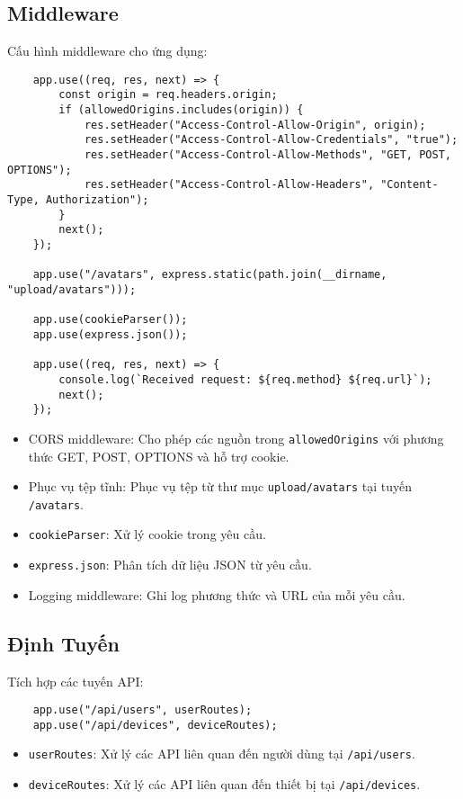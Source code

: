         \subsection{Middleware}
            \hspace*{0.6cm}Cấu hình middleware cho ứng dụng:
            \begin{lstlisting}
    app.use((req, res, next) => {
        const origin = req.headers.origin;
        if (allowedOrigins.includes(origin)) {
            res.setHeader("Access-Control-Allow-Origin", origin);
            res.setHeader("Access-Control-Allow-Credentials", "true");
            res.setHeader("Access-Control-Allow-Methods", "GET, POST, OPTIONS");
            res.setHeader("Access-Control-Allow-Headers", "Content-Type, Authorization");
        }
        next();
    });

    app.use("/avatars", express.static(path.join(__dirname, "upload/avatars")));

    app.use(cookieParser());
    app.use(express.json());

    app.use((req, res, next) => {
        console.log(`Received request: ${req.method} ${req.url}`);
        next();
    });
            \end{lstlisting}
            \begin{itemize}
                \item CORS middleware: Cho phép các nguồn trong \texttt{allowedOrigins} với phương thức GET, POST, OPTIONS và hỗ trợ cookie.
                \item Phục vụ tệp tĩnh: Phục vụ tệp từ thư mục \texttt{upload/avatars} tại tuyến \texttt{/avatars}.
                \item \texttt{cookieParser}: Xử lý cookie trong yêu cầu.
                \item \texttt{express.json}: Phân tích dữ liệu JSON từ yêu cầu.
                \item Logging middleware: Ghi log phương thức và URL của mỗi yêu cầu.
            \end{itemize}

        \subsection{Định Tuyến}
            \hspace*{0.6cm}Tích hợp các tuyến API:
            \begin{lstlisting}
    app.use("/api/users", userRoutes);
    app.use("/api/devices", deviceRoutes);
            \end{lstlisting}
            \begin{itemize}
                \item \texttt{userRoutes}: Xử lý các API liên quan đến người dùng tại \texttt{/api/users}.
                \item \texttt{deviceRoutes}: Xử lý các API liên quan đến thiết bị tại \texttt{/api/devices}.
            \end{itemize}

